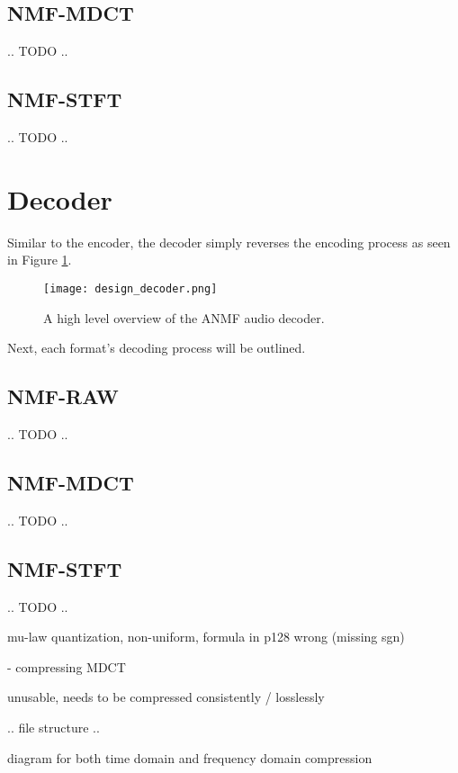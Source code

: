 \subsection{NMF-MDCT}
.. TODO ..

\subsection{NMF-STFT}
.. TODO ..

\section{Decoder}
Similar to the encoder, the decoder simply reverses the encoding process as seen in Figure \ref{fig:design_decoder}.

\begin{figure}[ht]
	\label{fig:design_decoder}
	\caption[Decoder overview]{A high level overview of the ANMF audio decoder.}
	\centering
	\texttt{[image: design\_decoder.png]}
\end{figure}

Next, each format's decoding process will be outlined.

\subsection{NMF-RAW}
.. TODO ..

\subsection{NMF-MDCT}
.. TODO ..

\subsection{NMF-STFT}
.. TODO ..

mu-law quantization, non-uniform, formula in p128 wrong (missing sgn)\

- compressing MDCT

unusable, needs to be compressed consistently / losslessly

.. file structure ..

diagram for both time domain and frequency domain compression

